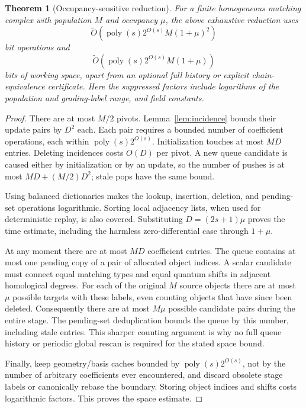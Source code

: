 \documentclass[11pt,letterpaper]{article}
\newtheorem{theorem}{Theorem}[section]
\theoremstyle{remark}\newtheorem{remark}[theorem]{Remark}
\newcommand{\poly}{\operatorname{poly}}
\begin{document}
\begin{theorem}[Occupancy-sensitive reduction]\label{thm:work}
For a finite homogeneous matching complex with population $M$ and occupancy $\mu$, the above exhaustive reduction uses
\begin{equation}\label{eq:mainwork}
 \widetilde O\!\left(\poly(s)2^{O(s)}M(1+\mu)^2\right)
\end{equation}
bit operations and
\begin{equation}\label{eq:mainspace}
 \widetilde O\!\left(\poly(s)2^{O(s)}M(1+\mu)\right)
\end{equation}
bits of working space, apart from an optional full history or explicit chain-equivalence certificate. Here the suppressed factors include logarithms of the population and grading-label range, and field constants.
\end{theorem}
\begin{proof}
There are at most $M/2$ pivots. Lemma~\ref{lem:incidence} bounds their update pairs by $D^2$ each. Each pair requires a bounded number of coefficient operations, each within $\poly(s)2^{O(s)}$. Initialization touches at most $MD$ entries. Deleting incidences costs $O(D)$ per pivot. A new queue candidate is caused either by initialization or by an update, so the number of pushes is at most $MD+(M/2)D^2$; stale pops have the same bound.

Using balanced dictionaries makes the lookup, insertion, deletion, and pending-set operations logarithmic. Sorting local adjacency lists, when used for deterministic replay, is also covered. Substituting $D=(2s+1)\mu$ proves the time estimate, including the harmless zero-differential case through $1+\mu$.

At any moment there are at most $MD$ coefficient entries. The queue contains at most one pending copy of a pair of allocated object indices. A scalar candidate must connect equal matching types and equal quantum shifts in adjacent homological degrees. For each of the original $M$ source objects there are at most $\mu$ possible targets with these labels, even counting objects that have since been deleted. Consequently there are at most $M\mu$ possible candidate pairs during the entire stage. The pending-set deduplication bounds the queue by this number, including stale entries. This sharper counting argument is why no full queue history or periodic global rescan is required for the stated space bound.

Finally, keep geometry/basis caches bounded by $\poly(s)2^{O(s)}$, not by the number of arbitrary coefficients ever encountered, and discard obsolete stage labels or canonically rebase the boundary. Storing object indices and shifts costs logarithmic factors. This proves the space estimate.
\end{proof}
\end{document}
